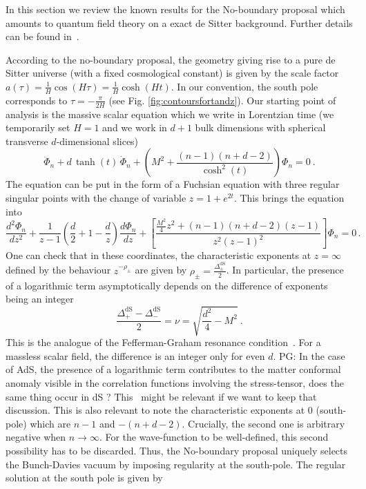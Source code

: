 \documentclass[a4paper,11pt]{article}
\newcommand{\purple}[1]{{\color{purple} #1 \color{black}}}
\newcommand{\PG}[1]{{\purple{PG: #1}}} %
\begin{document}
In this section we review the known results for the No-boundary proposal which amounts to quantum field theory on a exact de Sitter background. Further details can be found in~\cite{Bousso_2002,Lehners:2023yrj,PhysRevD.31.754,Maldacena:2024uhs,Wada:1986uy,PhysRevD.32.3136,Birrell:1982ix,AKHMEDOV_2014}. 

According to the no-boundary proposal, the geometry giving rise to a pure de Sitter universe (with a fixed cosmological constant) is given by the scale factor $a(\tau)=\frac{1}{H}\cos(H\tau)=\frac{1}{H}\cosh(Ht)$. In our convention, the south pole corresponds to $\tau=-\frac{\pi}{2H}$ (see Fig. \ref{fig:contoursfortandz}). Our starting point of analysis is the massive scalar equation which we write in Lorentzian time (we temporarily set $H=1$ and we work in $d+1$ bulk dimensions with spherical transverse $d$-dimensional slices)
\begin{equation}\label{eq:EOMPhilor_mode_general_d}
\ddot{\Phi}_n+d\,\tanh(t)\,\dot{\Phi}_n+\left(M^2+\frac{(n-1)(n+d-2)}{\cosh^2(t)}\right)\Phi_n=0~.
\end{equation}
The equation can be put in the form of a Fuchsian equation with three regular singular points with the change of variable $z=1+e^{2t}$. This brings the equation into
\begin{equation}\label{eq:eqforz}
    \frac{d^2\Phi_n}{dz^2}+\frac{1}{z-1}\left(\frac{d}{2}+1-\frac{d}{z}\right)\frac{d\Phi_n}{dz}+\left[\frac{\frac{M^2}{4}z^2+(n-1)(n+d-2)(z-1)}{z^2(z-1)^2}\right]\Phi_n=0 \, .
\end{equation}
One can check that in these coordinates, the characteristic exponents at $z=\infty$ defined by the behaviour $z^{-\rho_{\pm}}$ are given by  $\rho_{\pm}=\frac{\Delta_\pm^{\text{dS}}}{2}$. In particular, the presence of a logarithmic term asymptotically depends on the difference of exponents being an integer
\begin{equation}
    \frac{\Delta_+^{\text{dS}}-\Delta_-^{\text{dS}}}{2}=\nu=\sqrt{\frac{d^2}{4}-M^2}~.
\end{equation}
This is the analogue of the Fefferman-Graham resonance condition~\cite{fefferman2008ambientmetric,deHaro:2000vlm,Skenderis:2002wp}. For a massless scalar field, the difference is an integer only for even $d$. \PG{In the case of AdS, the presence of a logarithmic term contributes to the matter conformal anomaly visible in the correlation functions involving the stress-tensor\cite{Skenderis:2002wp,deHaro:2000vlm}, does the same thing occur in dS ? This~\cite{Bzowski_2024} might be relevant if we want to keep that discussion.} This is also relevant to note the characteristic exponents at $0$ (south-pole) which are $n-1$ and $-(n+d-2)$. Crucially, the second one is arbitrary negative when $n\to \infty$. For the wave-function to be well-defined, this second possibility has to be discarded. Thus, the No-boundary proposal uniquely selects the Bunch-Davies vacuum by imposing regularity at the south-pole. The regular solution at the south pole is given by
\end{document}
